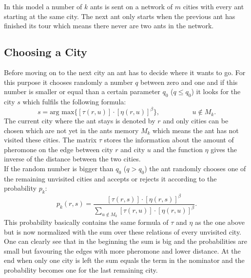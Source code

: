 In this model a number of $k$ ants is sent on a network of $m$ cities with every ant starting at the same city. The next ant only starts when the previous ant has finished its tour which means there never are two ants in the network. \\
\subsection{Choosing a City}
Before moving on to the next city an ant has to decide where it wants to go. For this purpose it chooses randomly a number $q$ between zero and one and if this number is smaller or equal than a certain parameter $q_0$ ($q \leqslant q_0$) it looks for the city $s$ which fulfils the following formula:
\begin{equation}
s = \text{arg max}\{[\tau (r,u)] \cdot [\eta (r,u)]^{\beta}\}, \hspace{2cm} u \not\in M_k.
\label{eq:qsmallerq0}
\end{equation}
The current city where the ant stays is denoted by $r$ and only cities can be chosen which are not yet in the ants memory $M_k$ which means the ant has not visited these cities. The matrix $\tau$ stores the information about the amount of pheromone on the edge between city $r$ and city $u$ and the function $\eta$ gives the inverse of the distance between the two cities. \\
If the random number is bigger than $q_0$ ($q > q_0$) the ant randomly chooses one of the remaining unvisited cities and accepts or rejects it according to the probability $p_k$:
\begin{equation}
p_k (r,s) = \frac{[\tau (r,s)] \cdot [\eta (r,s)]^{\beta}}{\sum_{u \not\in M_k}[\tau (r,u)] \cdot [\eta (r,u)]^{\beta}}.
\label{eq:prob}
\end{equation}
This probability basically contains the same formula of $\tau$ and $\eta$ as the one above but is now normalized with the sum over these relations of every unvisited city. One can clearly see that in the beginning the sum is big and the probabilities are small but favouring the edges with more pheromone and lower distance. At the end when only one city is left the sum equals the term in the nominator and the probability becomes one for the last remaining city.
